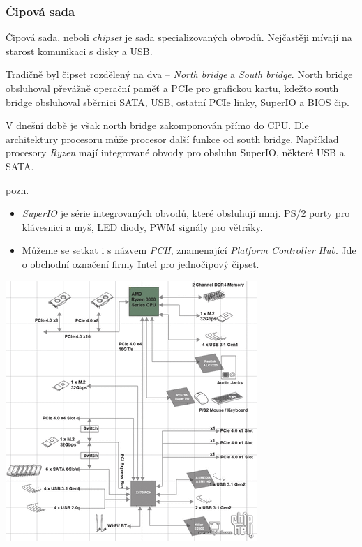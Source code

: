 \documentclass[a4paper]{article}
\begin{document}
        \subsubsection{Čipová sada}
        \begin{multicols}{2}
                Čipová sada, neboli \textit{chipset} je sada specializovaných obvodů. Nejčastěji mívají na starost komunikaci s disky a USB. 
                \par
                Tradičně byl čipset rozdělený na dva -- \textit{North bridge} a \textit{South bridge}. North bridge obsluhoval převážně operační paměť a PCIe pro grafickou kartu, kdežto south bridge obsluhoval sběrnici SATA, USB, ostatní PCIe linky, SuperIO a BIOS čip. 
                \par
                V dnešní době je však north bridge zakomponován přímo do CPU. Dle architektury procesoru může procesor  další funkce od south bridge. Například procesory \textit{Ryzen} mají integrované obvody pro obsluhu SuperIO, některé USB a SATA. \par
                pozn.
                \begin{itemize}
                    \item  \textit{SuperIO} je série integrovaných obvodů, které obsluhují mmj. PS/2 porty pro klávesnici a myš, LED    diody, PWM signály pro větráky.
                    \item Můžeme se setkat i s názvem \textit{PCH}, znamenající \textit{Platform Controller Hub}. Jde o obchodní označení firmy Intel pro jednočipový čipset. 
                \end{itemize} 
                \vspace{48pt}
                \includegraphics[scale=0.9]{img/chipset.png} \par
        \end{multicols}
\end{document}
